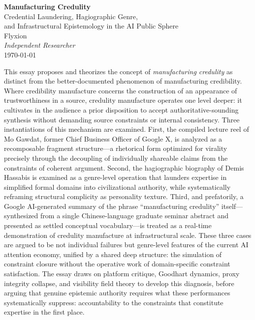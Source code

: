 \documentclass[12pt, a4paper]{article}
\begin{document}
\begin{center}
  {\LARGE\bfseries Manufacturing Credulity}\\[0.6em]
  {\large Credential Laundering, Hagiographic Genre,\\[0.2em]
  and Infrastructural Epistemology in the AI Public Sphere}\\[1.2em]
  {\normalsize Flyxion}\\
  {\small\itshape Independent Researcher}\\[0.5em]
  {\small \today}
\end{center}

\vspace{0.8em}

 {\small This essay proposes and theorizes the concept of
\textit{manufacturing credulity} as distinct from the better-documented phenomenon of manufacturing
credibility. Where credibility manufacture concerns the construction of an appearance of
trustworthiness in a source, credulity manufacture operates one level deeper: it cultivates in the
audience a prior disposition to accept authoritative-sounding synthesis without demanding source
constraints or internal consistency. Three instantiations of this mechanism are examined. First,
the compiled lecture reel of Mo Gawdat, former Chief Business Officer of Google X, is analyzed as
a recomposable fragment structure---a rhetorical form optimized for virality precisely through the
decoupling of individually shareable claims from the constraints of coherent argument. Second, the
hagiographic biography of Demis Hassabis is examined as a genre-level operation that launders
expertise in simplified formal domains into civilizational authority, while systematically
reframing structural complicity as personality texture. Third, and prefatorily, a Google
AI-generated summary of the phrase ``manufacturing credulity'' itself---synthesized from a single
Chinese-language graduate seminar abstract and presented as settled conceptual vocabulary---is
treated as a real-time demonstration of credulity manufacture at infrastructural scale. These three
cases are argued to be not individual failures but genre-level features of the current AI attention
economy, unified by a shared deep structure: the simulation of constraint closure without the
operative work of domain-specific constraint satisfaction. The essay draws on platform critique,
Goodhart dynamics, proxy integrity collapse, and visibility field theory to develop this diagnosis,
before arguing that genuine epistemic authority requires what these performances systematically
suppress: accountability to the constraints that constitute expertise in the first place.}
\end{document}
